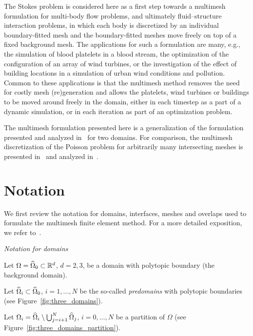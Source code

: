 \documentclass[graybox]{svmult}
\begin{document}
The Stokes problem is considered here as a first step towards a multimesh formulation for multi-body flow problems, and ultimately fluid--structure interaction problems, in which each body is discretized by an individual boundary-fitted mesh and the boundary-fitted meshes move freely on top of a fixed background mesh. The applications for such a formulation are many, e.g., the simulation of blood platelets in a blood stream, the optimization of the configuration of an array of wind turbines, or the investigation of the effect of building locations in a simulation of urban wind conditions and pollution. Common to these applications is that the multimesh method removes the need for costly mesh (re)generation and allows the platelets, wind turbines or buildings to be moved around freely in the domain, either in each timestep as a part of a dynamic simulation, or in each iteration as part of an optimization problem.

The multimesh formulation presented here is a generalization of the formulation presented and analyzed in~\cite{Johansson:2015aa} for two domains. For comparison, the multimesh discretization of the Poisson problem for arbitrarily many intersecting meshes is presented in~\cite{mmfem-1} and analyzed in~\cite{mmfem-2}.

\section{Notation}
\label{sec:notation}

We first review the notation for domains, interfaces, meshes and overlaps used to formulate the multimesh finite element method. For a more detailed exposition, we refer to~\cite{mmfem-1}.

\begin{mytcolorbox}
\emph{Notation for domains}
\tcblower

Let $\Omega = \widehat{\Omega}_0 \subset \mathbb{R}^d$, $d = 2,3$, be a domain with polytopic boundary (the background domain).

Let $\widehat{\Omega}_i \subset \widehat{\Omega}_0$, $i=1,\ldots, N$ be the so-called \emph{predomains} with polytopic boundaries (see Figure~\ref{fig:three_domains}).

Let $\Omega_i = \widehat{\Omega}_i \setminus \bigcup_{j=i+1}^{N} \widehat{\Omega}_j$,  $i=0, \ldots, N$ be a partition of $\Omega$ (see Figure~\ref{fig:three_domains_partition}).
\end{mytcolorbox}
\end{document}
